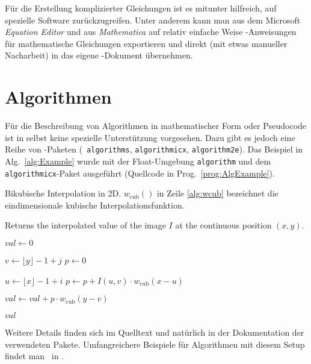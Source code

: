 Für die Erstellung komplizierter Gleichungen ist es mitunter
hilfreich, auf spezielle Software zurückzugreifen. Unter anderem kann man
aus dem Microsoft \emph{Equation Editor} und aus {\em
Mathematica} auf relativ einfache Weise \latex-An\-wei\-sun\-gen
für mathematische Gleichungen exportieren und direkt (mit etwas
manueller Nacharbeit) in das eigene \latex-Dokument übernehmen.


\section{Algorithmen}

Für die Beschreibung von Algorithmen in mathematischer Form oder
Pseudo\-code ist in \latex selbst keine spezielle Unterstützung vorgesehen.
Dazu gibt es jedoch eine Reihe von \latex-Paketen (\zB\ \texttt{algorithms}, 
\texttt{algorithmicx}, \texttt{algorithm2e}).
Das Beispiel in Alg.~\ref{alg:Example} wurde mit der Float-Umgebung \texttt{algorithm} 
und dem \texttt{algorithmicx}-Paket ausgeführt
(Quellcode in Prog.~\ref{prog:AlgExample}).

\begin{algorithm}[tbp]
\caption{Bikubische Interpolation in 2D.
	$w_{\mathrm{cub}}()$ in Zeile \ref{alg:wcub} bezeichnet die 
	eindimensionale kubische Interpolationsfunktion.}
\label{alg:Example}

\begin{algorithmic}[1]%
 
	\Statex Returns the interpolated value of the image $I$ 
					at the continuous position $(x, y)$.
	
	\State $\mathit{val} \gets 0$
	
	 
		\State $v \gets \lfloor y \rfloor - 1 + j$
		\State $p \gets 0$
		
		 
			\State $u \gets \lfloor x \rfloor - 1 + i$
			\State $p \gets p + I(u,v) \cdot w_{\mathrm{cub}}(x - u )$
					\label{alg:wcub}
		\EndFor
		
		\State $\mathit{val} \gets \mathit{val} + p \cdot w_{\mathrm{cub}}(y - v)$
	\EndFor
	
	\State\Return $\mathit{val}$
	
\EndProcedure
\end{algorithmic}
\end{algorithm}

Weitere Details finden sich im Quelltext und natürlich in der Dokumentation der verwendeten Pakete.
Umfangreichere Beispiele für Algorithmen mit diesem Setup findet man \ua\ in \cite{BurgerBurge06}.


